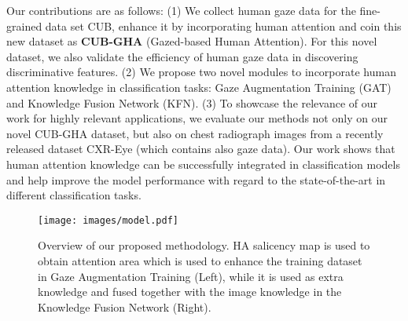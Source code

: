 \documentclass{bmvc2k}
\begin{document}
Our contributions are as follows: (1) We collect human gaze data for the fine-grained data set CUB, enhance it by incorporating human attention and coin this new dataset as \textbf{CUB-GHA} (Gazed-based Human Attention). For this novel dataset, we also validate the efficiency of human gaze data in discovering discriminative features. (2) We propose two novel modules to incorporate human attention knowledge in classification tasks: Gaze Augmentation Training (GAT) and Knowledge Fusion Network (KFN). (3) To showcase the relevance of our work for highly relevant applications, we evaluate our methods not only on our novel CUB-GHA dataset, but also on chest radiograph images from a recently released dataset CXR-Eye (which contains also gaze data). Our work shows that human attention knowledge can be successfully integrated in classification models and help improve the model performance with regard to the state-of-the-art in different classification tasks.

























\begin{figure*}[t]
\begin{center}
   \texttt{[image: images/model.pdf]}
\end{center}
\caption{Overview of our proposed methodology. HA salicency map is used to obtain attention area which is used to enhance the training dataset in Gaze Augmentation Training (Left), while it is used as extra knowledge and fused together with the image knowledge in the Knowledge Fusion Network (Right).
   }
   \vspace{-5mm}
\label{fig:model}
\end{figure*}
\end{document}
